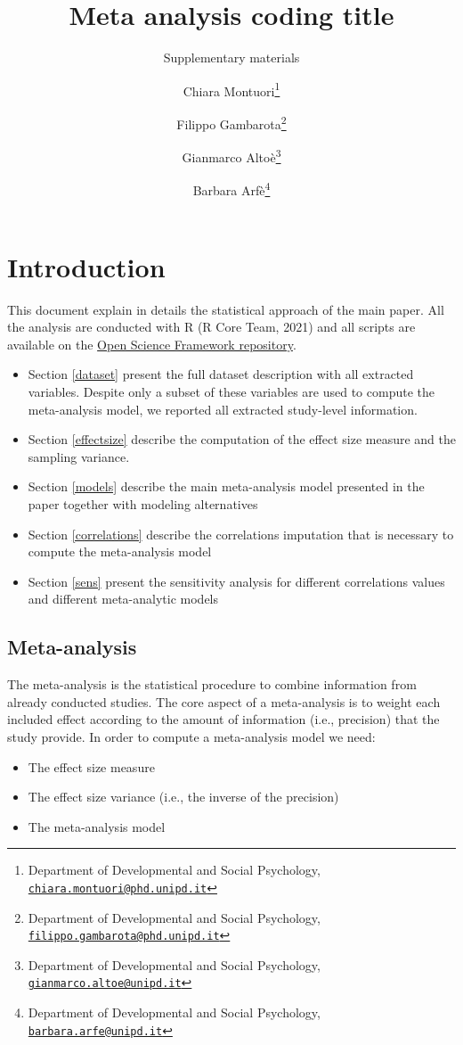 \documentclass[
]{article}
\title{Meta analysis coding title}
\subtitle{Supplementary materials}
\author{Chiara Montuori\footnote{Department of Developmental and Social Psychology, \href{mailto:chiara.montuori@phd.unipd.it}{\nolinkurl{chiara.montuori@phd.unipd.it}}} \and Filippo Gambarota\footnote{Department of Developmental and Social Psychology, \href{mailto:filippo.gambarota@phd.unipd.it}{\nolinkurl{filippo.gambarota@phd.unipd.it}}} \and Gianmarco Altoè\footnote{Department of Developmental and Social Psychology, \href{mailto:gianmarco.altoe@unipd.it}{\nolinkurl{gianmarco.altoe@unipd.it}}} \and Barbara Arfè\footnote{Department of Developmental and Social Psychology, \href{mailto:barbara.arfe@unipd.it}{\nolinkurl{barbara.arfe@unipd.it}}}}
\date{}
\providecommand{\tightlist}{%
  \setlength{\itemsep}{0pt}\setlength{\parskip}{0pt}}
\begin{document}
\maketitle

{
\setcounter{tocdepth}{2}
\tableofcontents
}
\pagebreak

\hypertarget{introduction}{%
\section{Introduction}\label{introduction}}

This document explain in details the statistical approach of the main paper. All the analysis are conducted with R (R Core Team, 2021) and all scripts are available on the \href{https://osf.io/uvbcd/}{Open Science Framework repository}.

\begin{itemize}
\tightlist
\item
  Section \ref{dataset} present the full dataset description with all extracted variables. Despite only a subset of these variables are used to compute the meta-analysis model, we reported all extracted study-level information.
\item
  Section \ref{effectsize} describe the computation of the effect size measure and the sampling variance.
\item
  Section \ref{models} describe the main meta-analysis model presented in the paper together with modeling alternatives
\item
  Section \ref{correlations} describe the correlations imputation that is necessary to compute the meta-analysis model
\item
  Section \ref{sens} present the sensitivity analysis for different correlations values and different meta-analytic models
\end{itemize}

\hypertarget{meta-analysis}{%
\subsection{Meta-analysis}\label{meta-analysis}}

The meta-analysis is the statistical procedure to combine information from already conducted studies. The core aspect of a meta-analysis is to weight each included effect according to the amount of information (i.e., precision) that the study provide. In order to compute a meta-analysis model we need:

\begin{itemize}
\tightlist
\item
  The effect size measure
\item
  The effect size variance (i.e., the inverse of the precision)
\item
  The meta-analysis model
\end{itemize}
\end{document}
